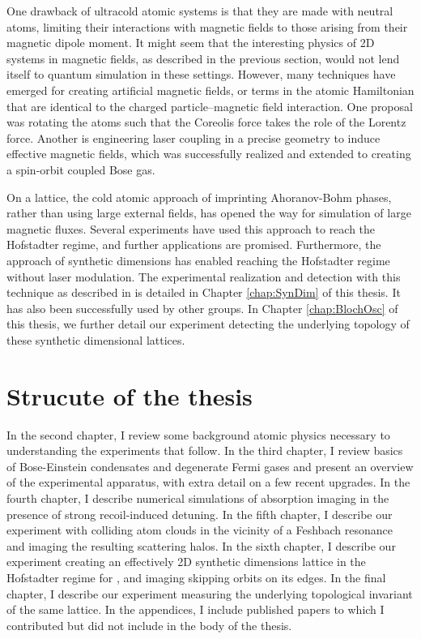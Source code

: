 One drawback of ultracold atomic systems is that they are made with neutral atoms, limiting their interactions with magnetic fields to those arising from their magnetic dipole moment. It might seem that the interesting physics of 2D systems in magnetic fields, as described in the previous section, would not lend itself to quantum simulation in these settings. However, many techniques have emerged for creating artificial magnetic fields, or terms in the atomic Hamiltonian that are identical to the charged particle--magnetic field interaction. One proposal was rotating the atoms such that the Coreolis force takes the role of the Lorentz force\cite{Cooper2008}. Another is engineering laser coupling in a precise geometry to induce effective magnetic fields\cite{Juzeliunas2006}, which was successfully realized\cite{Lin2009b} and extended to creating a spin-orbit coupled Bose gas\cite{Lin2011}. 

On a lattice, the cold atomic approach of imprinting Ahoranov-Bohm phases, rather than using large external fields, has opened the way for simulation of large magnetic fluxes\cite{Jaksch2003,Mueller2004,Sorensen2005}. Several experiments have used this approach to reach the Hofstadter regime\cite{Aidelsburger2013,Miyake2013,Jotzu2014,Aidelsburger2014,Mancini2015,An2017}, and further applications are promised\cite{Mazza2012}. Furthermore, the approach of synthetic dimensions\cite{Celi2014} has enabled reaching the Hofstadter regime without laser modulation. The experimental realization and detection with this technique as described in\cite{Stuhl2015} is detailed in Chapter \ref{chap:SynDim} of this thesis. It has also been successfully used by other groups\cite{Mancini2015,Meier2016}. In Chapter \ref{chap:BlochOsc} of this thesis, we further detail our experiment detecting the underlying topology of these synthetic dimensional lattices. 


\section{Strucute of the thesis}
In the second chapter, I review some background atomic physics necessary to understanding the experiments that follow. In the third chapter, I review basics of Bose-Einstein condensates and degenerate Fermi gases and present an overview of the experimental apparatus, with extra detail on a few recent upgrades. In the fourth chapter, I describe numerical simulations of absorption imaging in the presence of strong recoil-induced detuning. In the fifth chapter, I describe our experiment with colliding \K{} atom clouds in the vicinity of a Feshbach resonance and imaging the resulting \swave{} scattering halos. In the sixth chapter, I describe our experiment creating an effectively 2D synthetic dimensions lattice in the Hofstadter regime for \Rb{}, and imaging skipping orbits on its edges. In the final chapter, I describe our experiment measuring the underlying topological invariant of the same lattice. In the appendices, I include published papers to which I contributed but did not include in the body of the thesis.  
